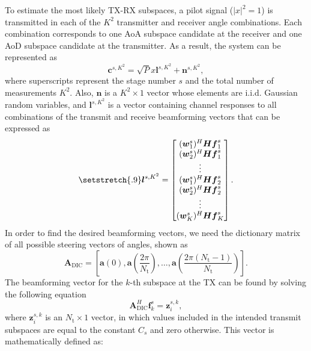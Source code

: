 \documentclass{ieeeaccess}
\begin{document}
To estimate the most likely TX-RX subspaces, a pilot signal ($|x|^2 = 1$) is transmitted in each of the $K^2$ transmitter and receiver angle combinations. Each combination corresponds to one AoA subspace candidate at the receiver and one AoD subspace candidate at the transmitter. As a result, the system can be represented as
\begin{equation} \label{n13}
\boldsymbol{c}^{s,K^2} = \sqrt{P}x\boldsymbol{l}^{s,K^2}+\boldsymbol{n}^{s,K^2},
\end{equation}
where superscripts represent the stage number $s$ and the total number of measurements $K^2$. Also, $\boldsymbol{n}$ is a $K^2\times1$ vector whose elements are i.i.d. Gaussian random variables, and $\boldsymbol{l}^{s,K^2}$ is a vector containing channel responses to all combinations of the transmit and receive beamforming vectors that can be expressed as
\begin{equation} \label{n14}
\setstretch{.9}
\boldsymbol{l}^{s,K^2} =
\begin{bmatrix}
    (\boldsymbol{w}^s_1)^H\boldsymbol{H}\boldsymbol{f}^s_1  \\
    (\boldsymbol{w}^s_2)^H\boldsymbol{H}\boldsymbol{f}^s_1   \\
    \vdots  \\
    (\boldsymbol{w}^s_1)^H\boldsymbol{H}\boldsymbol{f}^s_2  \\
    (\boldsymbol{w}^s_2)^H\boldsymbol{H}\boldsymbol{f}^s_2   \\
    \vdots  \\

    (\boldsymbol{w}^s_K)^H\boldsymbol{H}\boldsymbol{f}^s_{K}
\end{bmatrix}.
\end{equation}
In order to find the desired beamforming vectors, we need the dictionary matrix of all possible steering vectors of angles, shown as
\begin{equation} \label{n15}
\boldsymbol{A}_{\textrm{DIC}} = [ \boldsymbol{a}(0), \boldsymbol{a}(\frac{2\pi}{N_\textrm{t}}),\dots, \boldsymbol{a}(\frac{2\pi(N_\textrm{t}-1)}{N_\textrm{t}})].
\end{equation}
The beamforming vector for the $k$-th subspace at the TX can be found by solving the following equation
\begin{equation} \label{n16}
\boldsymbol{A}_{\textrm{DIC}}^H\boldsymbol{f}_k^{s} = \boldsymbol{z}_i^{s,k},
\end{equation}
where $\boldsymbol{z}_i^{s,k}$ is an $N_\textrm{t}\times 1$ vector, in which values included in the intended transmit subspaces are equal to the constant $C_s$ and zero otherwise. This vector is mathematically defined as:
\end{document}
